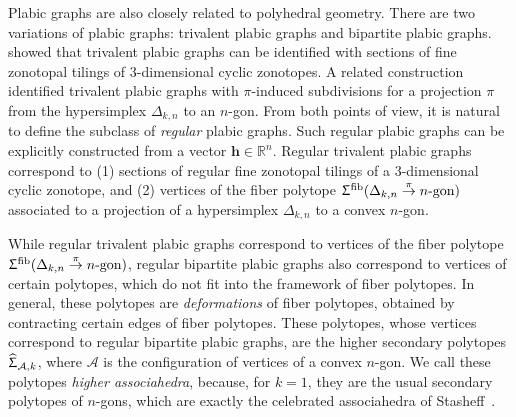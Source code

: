 \documentclass[11pt]{amsart}
\theoremstyle{plain}
\theoremstyle{definition}
\def\R{\mathbb{R}}
\def\A{\mathcal{A}}
\def\h{{\bm{h}}}
\def\HSP{\widehat\Upsigma}
\def\Sigma{\HSP}
\def\fiber{{\operatorname{fib}}}
\def\FibPoly{\Upsigma^\fiber}
\def\pito{\overset \pi \to}
\begin{document}
Plabic graphs are also closely related to polyhedral geometry.  There are two
variations of plabic graphs: trivalent plabic graphs and bipartite plabic
graphs.  \cite{Gal} showed that trivalent plabic graphs can be identified with
sections of fine zonotopal tilings of 3-dimensional cyclic zonotopes.   A
related construction \cite{PosICM} identified trivalent plabic graphs with
$\pi$-induced subdivisions for a projection $\pi$ from the hypersimplex
$\Delta_{k,n}$ to an $n$-gon.  From both points of view, it is natural to define
the subclass of \emph{regular} plabic graphs.  Such regular plabic graphs can be
explicitly constructed from a vector $\h\in\R^n$.  Regular trivalent plabic graphs
correspond to (1) sections of regular fine zonotopal tilings 
of a 3-dimensional cyclic zonotope, 
and (2) vertices of the fiber polytope $\FibPoly(\Delta_{k,n}\pito \ngon)$ associated to a projection of a hypersimplex $\Delta_{k,n}$ to a convex $n$-gon.%


While regular trivalent plabic graphs correspond to vertices of 
the fiber polytope $\FibPoly(\Delta_{k,n}\pito \ngon)$,
regular bipartite plabic graphs also correspond to vertices of certain 
polytopes, which do not fit into the framework of fiber polytopes.
In general, these polytopes are \emph{deformations} of fiber polytopes, obtained by contracting certain 
edges of fiber polytopes. These polytopes, whose vertices correspond to regular bipartite plabic graphs,
are the higher secondary polytopes $\Sigma_{\A,k}$, where $\A$
is the configuration of vertices of a convex $n$-gon.
We call these polytopes \emph{higher associahedra}, because, 
for $k=1$, they are the usual secondary polytopes of $n$-gons, 
which are exactly the celebrated associahedra of Stasheff~\cite{Tamari,Stasheff}.
\end{document}
